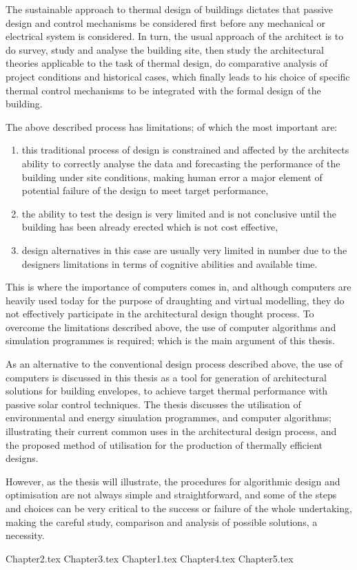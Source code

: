 The sustainable approach to thermal design of buildings dictates that passive design and control mechanisms be considered first before any mechanical or electrical system is considered. In turn, the usual approach of the architect is to do survey, study and analyse the building site, then study the architectural theories applicable to the task of thermal design, do comparative analysis of project conditions and historical cases, which finally leads to his choice of specific thermal control mechanisms to be integrated with the formal design of the building.

The above described process has limitations; of which the most important are:
\begin{enumerate}
	\item this traditional process of design is constrained and affected by the architects ability to correctly analyse the data and forecasting the performance of the building under site conditions, making human error a major element of potential failure of the design to meet target performance, 
	\item the ability to test the design is very limited and is not conclusive until the building has been already erected which is not cost effective, 
	\item design alternatives in this case are usually very limited in number due to the designers limitations in terms of cognitive abilities and available time.
\end{enumerate}

This is where the importance of computers comes in, and although computers are heavily used today for the purpose of draughting and virtual modelling, they do not effectively participate in the architectural design thought process. To overcome the limitations described above, the use of computer algorithms and simulation programmes is required; which is the main argument of this thesis.

As an alternative to the conventional design process described above, the use of computers is discussed in this thesis as a tool for generation of architectural solutions for building envelopes, to achieve target thermal performance with passive solar control techniques. The thesis discusses the utilisation of environmental and energy simulation programmes, and computer algorithms; illustrating their current common uses in the architectural design process, and the proposed method of utilisation for the production of thermally efficient designs.

However, as the thesis will illustrate, the procedures for algorithmic design and optimisation are not always simple and straightforward, and some of the steps and choices can be very critical to the success or failure of the whole undertaking, making the careful study, comparison and analysis of possible solutions, a necessity.

\mainmatter

{Chapter2.tex}
{Chapter3.tex}
{Chapter1.tex}
{Chapter4.tex}
{Chapter5.tex}




